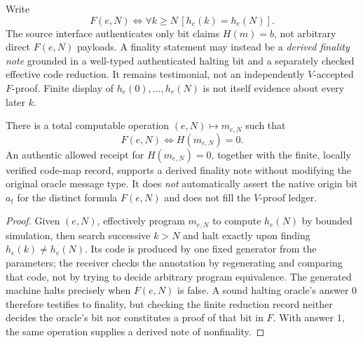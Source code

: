 \documentclass[11pt,letterpaper]{article}
\begin{document}
\begin{definition}
Write
\[F(e,N)\iff\forall k\ge N\,[h_e(k)=h_e(N)].\]
The source interface authenticates only bit claims $H(m)=b$, not arbitrary direct $F(e,N)$ payloads. A finality statement may instead be a \emph{derived finality note} grounded in a well-typed authenticated halting bit and a separately checked effective code reduction. It remains testimonial, not an independently $V$-accepted $F$-proof. Finite display of $h_e(0),\ldots,h_e(N)$ is not itself evidence about every later $k$.
\end{definition}
\begin{lemma}
There is a total computable operation $(e,N)\mapsto m_{e,N}$ such that
\[
F(e,N)\iff H(m_{e,N})=0.
\]
An authentic allowed receipt for $H(m_{e,N})=0$, together with the finite, locally verified code-map record, supports a derived finality note without modifying the original oracle message type. It does \emph{not} automatically assert the native origin bit $a_t$ for the distinct formula $F(e,N)$ and does not fill the $V$-proof ledger.
\end{lemma}
\begin{proof}
Given $(e,N)$, effectively program $m_{e,N}$ to compute $h_e(N)$ by bounded simulation, then search successive $k>N$ and halt exactly upon finding $h_e(k)\ne h_e(N)$. Its code is produced by one fixed generator from the parameters; the receiver checks the annotation by regenerating and comparing that code, not by trying to decide arbitrary program equivalence. The generated machine halts precisely when $F(e,N)$ is false. A sound halting oracle's answer $0$ therefore testifies to finality, but checking the finite reduction record neither decides the oracle's bit nor constitutes a proof of that bit in $F$. With answer $1$, the same operation supplies a derived note of nonfinality.
\end{proof}
\end{document}
